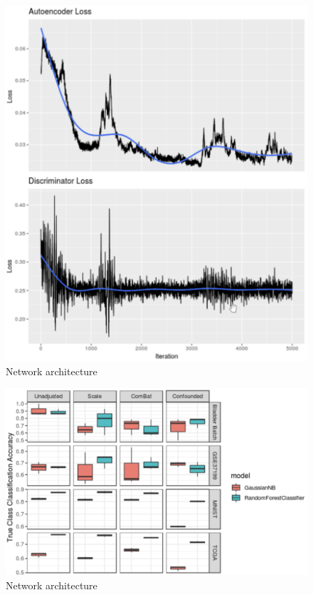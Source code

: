 \documentclass[notitlepage]{article}
\begin{document}
\begin{figure}
	\centering
	\includegraphics[width=4.5in]{figures/rough/training_loss}
	\caption{Network architecture}
	\label{simulationfigure}
\end{figure}
\begin{figure}
	\centering
	\includegraphics[width=4.5in]{figures/rough/true_class_accuracy}
	\caption{Network architecture}
	\label{simulationfigure}
\end{figure}
\end{document}
